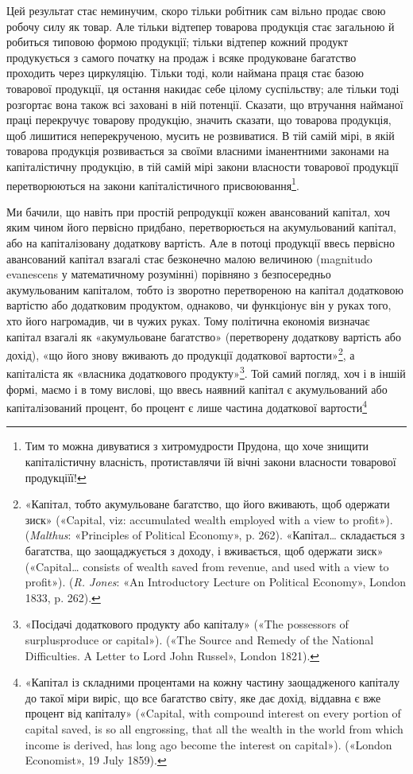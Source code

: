 Цей результат стає неминучим, скоро тільки робітник сам
вільно продає свою робочу силу як товар. Але тільки відтепер товарова
продукція стає загальною й робиться типовою формою продукції;
тільки відтепер кожний продукт продукується з самого
початку на продаж і всяке продуковане багатство проходить через
циркуляцію. Тільки тоді, коли наймана праця стає базою товарової
продукції, ця остання накидає себе цілому суспільству;
але тільки тоді розгортає вона також всі заховані в ній потенції.
Сказати, що втручання найманої праці перекручує товарову
продукцію, значить сказати, що товарова продукція, щоб лишитися
неперекрученою, мусить не розвиватися. В тій самій мірі,
в якій товарова продукція розвивається за своїми власними
іманентними законами на капіталістичну продукцію, в тій самій
мірі закони власности товарової продукції перетворюються на
закони капіталістичного присвоювання\footnote{
Тим то можна дивуватися з хитромудрости Прудона, що хоче знищити
капіталістичну власність, протиставлячи їй вічні закони власности
товарової продукціїї!
}.

Ми бачили, що навіть при простій репродукції кожен авансований
капітал, хоч яким чином його первісно придбано, перетворюється
на акумульований капітал, або на капіталізовану
додаткову вартість. Але в потоці продукції ввесь первісно авансований
капітал взагалі стає безконечно малою величиною (magnitudo
evanescens у математичному розумінні) порівняно з безпосередньо
акумульованим капіталом, тобто із зворотно перетвореною
на капітал додатковою вартістю або додатковим продуктом,
однаково, чи функціонує він у руках того, хто його нагромадив,
чи в чужих руках. Тому політична економія визначає капітал
взагалі як «акумульоване багатство» (перетворену додаткову
вартість або дохід), «що його знову вживають до продукції додаткової
вартости»\footnote{
«Капітал, тобто акумульоване багатство, що його вживають, щоб
одержати зиск» («Capital, viz: accumulated wealth employed with a
view to profit»). (\emph{Malthus}: «Principles of Political Economy», p. 262).
«Капітал\dots{} складається з багатства, що заощаджується з доходу, і вживається,
щоб одержати зиск» («Capital\dots{} consists of wealth saved from
revenue, and used with a view to profit»). (\emph{R. Jones}: «An Introductory
Lecture on Political Economy», London 1833, p. 262).
}, а капіталіста як «власника додаткового
продукту»\footnote{
«Посідачі додаткового продукту або капіталу» («The possessors
of surplusproduce or capital»). («The Source and Remedy of the National
Difficulties. A Letter to Lord John Russel», London 1821).
}. Той самий погляд, хоч і в іншій формі, маємо і
в тому вислові, що ввесь наявний капітал є акумульований або
капіталізований процент, бо процент є лише частина додаткової
вартости\footnote{
«Капітал із складними процентами на кожну частину заощадженого
капіталу до такої міри виріс, що все багатство світу, яке дає дохід,
віддавна є вже процент від капіталу» («Capital, with compound interest
on every portion of capital saved, is so all engrossing, that all the wealth
in the world from which income is derived, has long ago become the
interest on capital»). («London Economist», 19 July 1859).
}
